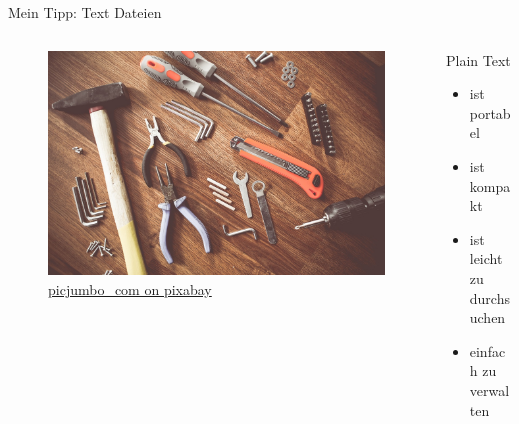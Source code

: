 \begin{frame}[t]{Mein Tipp: Text Dateien}
    \begin{columns}[t]
        \begin{column}{0.29\textwidth}      
            \vspace{-3em} 
            \begin{figure}[t]
                \begin{flushleft}
                    \includegraphics[height=0.8\textheight,trim={0 0 25cm 0},clip]{graphics/tools-864983_1280.jpg}         
                    \caption*{\href{https://pixabay.com/de/photos/werkzeuge-konstruieren-boot-864983/}{picjumbo\_com on pixabay}}    
                \end{flushleft}                
                      
            \end{figure}
        \end{column}        
        \begin{column}{0.7\textwidth}
            Plain Text
            \begin{itemize}
                \item ist portabel
                \item ist kompakt
                \item ist leicht zu durchsuchen
                \item einfach zu verwalten
            \end{itemize}
        \end{column}
    \end{columns}
\end{frame}



